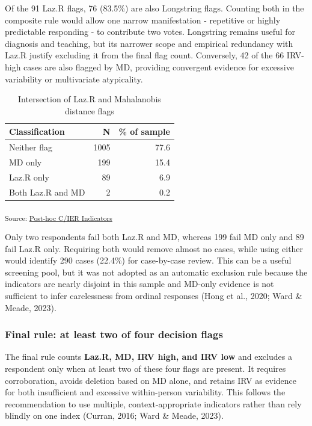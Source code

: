 \documentclass[
  letterpaper,
  DIV=11,
  numbers=noendperiod]{scrartcl}
\begin{document}
Of the 91 Laz.R flags, 76 (83.5\%) are also Longstring flags. Counting
both in the composite rule would allow one narrow manifestation -
repetitive or highly predictable responding - to contribute two votes.
Longstring remains useful for diagnosis and teaching, but its narrower
scope and empirical redundancy with Laz.R justify excluding it from the
final flag count. Conversely, 42 of the 66 IRV-high cases are also
flagged by MD, providing convergent evidence for excessive variability
or multivariate atypicality.

{

\begin{longtable}[]{@{}lrr@{}}

\caption{\label{tbl-lazr-md-intersection}Intersection of Laz.R and
Mahalanobis distance flags}

\tabularnewline

\toprule\noalign{}
Classification & N & \% of sample \\
\midrule\noalign{}
\endhead
\bottomrule\noalign{}
\endlastfoot
Neither flag & 1005 & 77.6 \\
MD only & 199 & 15.4 \\
Laz.R only & 89 & 6.9 \\
Both Laz.R and MD & 2 & 0.2 \\

\end{longtable}

}

\textsubscript{Source:
\href{https://phdpablo.github.io/cier/Scripts/ProcessingScripts/02_posthoc-preview.html\#cell-tbl-lazr-md-intersection}{Post-hoc
C/IER Indicators}}

Only two respondents fail both Laz.R and MD, whereas 199 fail MD only
and 89 fail Laz.R only. Requiring both would remove almost no cases,
while using either would identify 290 cases (22.4\%) for case-by-case
review. This can be a useful screening pool, but it was not adopted as
an automatic exclusion rule because the indicators are nearly disjoint
in this sample and MD-only evidence is not sufficient to infer
carelessness from ordinal responses (Hong et al., 2020; Ward \& Meade,
2023).

\subsubsection{Final rule: at least two of four decision
flags}\label{final-rule-at-least-two-of-four-decision-flags}

The final rule counts \textbf{Laz.R, MD, IRV high, and IRV low} and
excludes a respondent only when at least two of these four flags are
present. It requires corroboration, avoids deletion based on MD alone,
and retains IRV as evidence for both insufficient and excessive
within-person variability. This follows the recommendation to use
multiple, context-appropriate indicators rather than rely blindly on one
index (Curran, 2016; Ward \& Meade, 2023).
\end{document}
